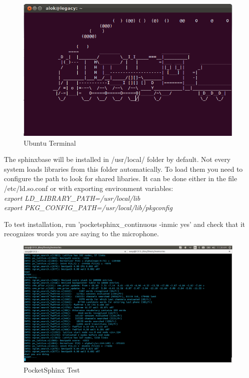 \documentclass[12pt,a4paper,oldfontcommands]{memoir}
\begin{document}
\begin{figure}[h]
    \centering
    \includegraphics[scale=0.55]{networknuts-linux-fun}
    \caption{Ubuntu Terminal}
\end{figure}

The sphinxbase will be installed in /usr/local/ folder by default. Not every system loads libraries from this folder automatically. To load them you need to configure the path to look for shared libaries. It can be done either in the file /etc/ld.so.conf or with exporting environment variables:
\\
\textit{export LD\_LIBRARY\_PATH=/usr/local/lib} \\
\textit{export PKG\_CONFIG\_PATH=/usr/local/lib/pkgconfig}


To test installation, run 'pocketsphinx\_continuous -inmic yes' and check that it recognizes words you are saying to the microphone. 

\begin{figure}[h]
    \centering
    \includegraphics[scale=0.3]{Screenshot1}
    \caption{PocketSphinx Test}
\end{figure}
\end{document}
